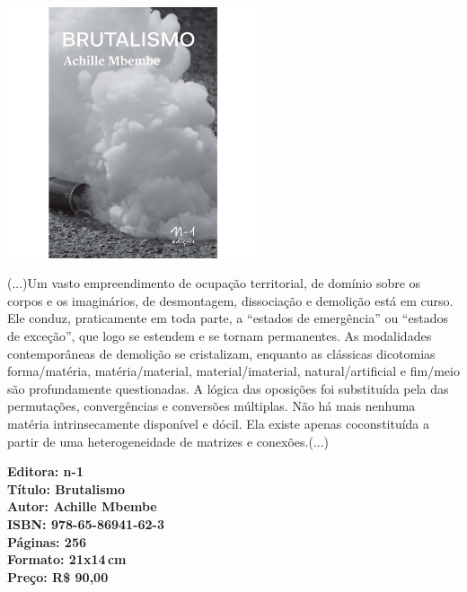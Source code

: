 \pagebreak

\begin{center}
\hspace*{.5cm}\includegraphics[width=74mm]{./CAPAS/brutalismo.jpg}
\end{center}

\hspace*{-7cm}\hrulefill\hspace*{-7cm}

\medskip

\noindent{}(...)Um vasto empreendimento de ocupação territorial, de domínio sobre os corpos e os imaginários, de desmontagem, dissociação e demolição está em curso. Ele conduz, praticamente em toda parte, a ``estados de emergência'' ou ``estados de exceção'', que logo se estendem e se tornam permanentes. As modalidades contemporâneas de demolição se cristalizam, enquanto as clássicas dicotomias forma/matéria, matéria/material, material/imaterial, natural/artificial e fim/meio são profundamente questionadas. A lógica das oposições foi substituída pela das permutações, convergências e conversões múltiplas. Não há mais nenhuma matéria intrinsecamente disponível e dócil. Ela existe apenas coconstituída a partir de uma heterogeneidade de matrizes e conexões.(...)

\vfill

\hspace*{-.4cm}\begin{minipage}[c]{1\linewidth}
\small\textbf{
\hspace*{-.1cm}Editora: n-1\\
Título: Brutalismo\\
Autor: Achille Mbembe\\
ISBN: 978-65-86941-62-3\\
Páginas: 256\\
Formato: 21x14\,cm\\
Preço: R\$ 90,00\\
}
\end{minipage}

